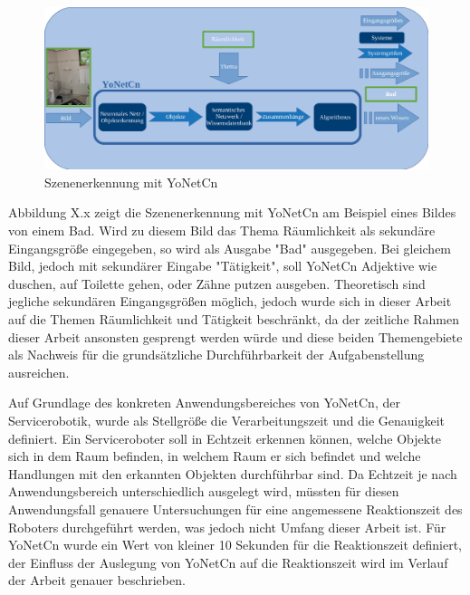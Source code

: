 \begin{figure}[h]
	
	\begin{center}
		
		\includegraphics[width=14cm]{images/Masteridee_2.png}
		
		\caption{Szenenerkennung mit YoNetCn}
		
		\label{system_Bild}
		
	\end{center}
	
	
\end{figure}


Abbildung X.x zeigt die Szenenerkennung mit YoNetCn am Beispiel eines Bildes von einem Bad. Wird zu diesem Bild das Thema Räumlichkeit als sekundäre Eingangsgröße eingegeben, so wird als Ausgabe "Bad" ausgegeben. Bei gleichem Bild, jedoch mit sekundärer Eingabe "Tätigkeit", soll YoNetCn Adjektive wie duschen, auf Toilette gehen, oder Zähne putzen ausgeben. Theoretisch sind jegliche sekundären Eingangsgrößen möglich, jedoch wurde sich in dieser Arbeit auf die Themen Räumlichkeit und Tätigkeit beschränkt, da der zeitliche Rahmen dieser Arbeit ansonsten gesprengt werden würde und diese beiden Themengebiete als Nachweis für die grundsätzliche Durchführbarkeit der Aufgabenstellung ausreichen. 


Auf Grundlage des konkreten Anwendungsbereiches von YoNetCn, der Servicerobotik, wurde als Stellgröße die Verarbeitungszeit und die Genauigkeit definiert. Ein Serviceroboter soll in Echtzeit erkennen können, welche Objekte sich in dem  Raum befinden, in welchem Raum er sich befindet und welche Handlungen mit den erkannten Objekten durchführbar sind. Da Echtzeit je nach Anwendungsbereich unterschiedlich ausgelegt wird, müssten für diesen Anwendungsfall genauere Untersuchungen für eine angemessene Reaktionszeit des Roboters durchgeführt werden, was jedoch nicht Umfang dieser Arbeit ist. Für YoNetCn wurde ein Wert von kleiner 10 Sekunden für die Reaktionszeit definiert, der Einfluss der Auslegung von YoNetCn auf die Reaktionszeit wird im Verlauf der Arbeit genauer beschrieben. 

